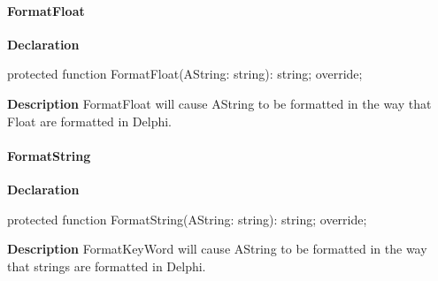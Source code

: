 \documentclass{report}
\newif\ifpdf
\begin{document}
\paragraph*{FormatFloat}\hspace*{\fill}

\label{PasDoc_GenHtml.TGenericHTMLDocGenerator-FormatFloat}
\begin{list}{}{
\setlength{\itemindent}{0cm}
\setlength{\listparindent}{0cm}
\setlength{\leftmargin}{\evensidemargin}
\addtolength{\leftmargin}{\tmplength}
\settowidth{\labelsep}{X}
\addtolength{\leftmargin}{\labelsep}
\setlength{\labelwidth}{\tmplength}
}
\item[\textbf{Declaration}\hfill]
\ifpdf
\begin{flushleft}
\fi
\begin{ttfamily}
protected function FormatFloat(AString: string): string; override;\end{ttfamily}

\ifpdf
\end{flushleft}
\fi

\par
\item[\textbf{Description}]
FormatFloat will cause AString to be formatted in the way that Float are formatted in Delphi.

\end{list}
\paragraph*{FormatString}\hspace*{\fill}

\label{PasDoc_GenHtml.TGenericHTMLDocGenerator-FormatString}
\begin{list}{}{
\setlength{\itemindent}{0cm}
\setlength{\listparindent}{0cm}
\setlength{\leftmargin}{\evensidemargin}
\addtolength{\leftmargin}{\tmplength}
\settowidth{\labelsep}{X}
\addtolength{\leftmargin}{\labelsep}
\setlength{\labelwidth}{\tmplength}
}
\item[\textbf{Declaration}\hfill]
\ifpdf
\begin{flushleft}
\fi
\begin{ttfamily}
protected function FormatString(AString: string): string; override;\end{ttfamily}

\ifpdf
\end{flushleft}
\fi

\par
\item[\textbf{Description}]
FormatKeyWord will cause AString to be formatted in the way that strings are formatted in Delphi.

\end{list}
\end{document}
